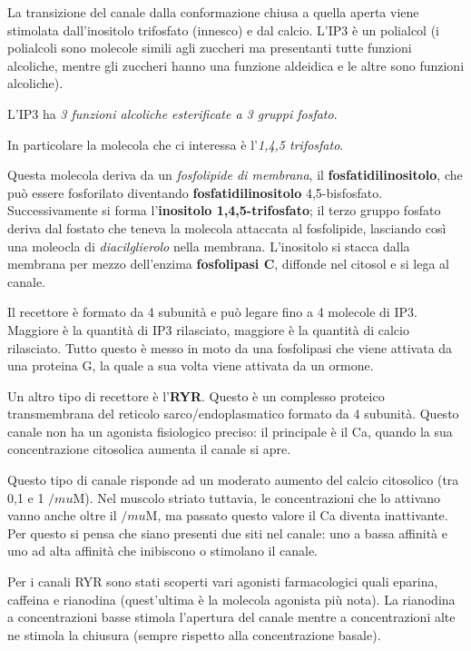 \documentclass[]{article}
\begin{document}
La transizione del canale dalla conformazione chiusa a quella aperta
viene stimolata dall'inositolo trifosfato (innesco) e dal calcio. L'IP3
è un polialcol (i polialcoli sono molecole simili agli zuccheri ma
presentanti tutte funzioni alcoliche, mentre gli zuccheri hanno una
funzione aldeidica e le altre sono funzioni alcoliche).

L'IP3 ha \emph{3 funzioni alcoliche esterificate a 3 gruppi fosfato}.

In particolare la molecola che ci interessa è l'\emph{1,4,5 trifosfato}.

Questa molecola deriva da un \emph{fosfolipide di membrana}, il
\textbf{fosfatidilinositolo}, che può essere fosforilato diventando
\textbf{fosfatidilinositolo} 4,5-bisfosfato. Successivamente si forma
l'\textbf{inositolo 1,4,5-trifosfato}; il terzo gruppo fosfato deriva
dal fostato che teneva la molecola attaccata al fosfolipide, lasciando
così una moleocla di \emph{diacilglierolo} nella membrana. L'inositolo
si stacca dalla membrana per mezzo dell'enzima \textbf{fosfolipasi C},
diffonde nel citosol e si lega al canale.

Il recettore è formato da 4 subunità e può legare fino a 4 molecole di
IP3. Maggiore è la quantità di IP3 rilasciato, maggiore è la quantità di
calcio rilasciato. Tutto questo è messo in moto da una fosfolipasi che
viene attivata da una proteina G, la quale a sua volta viene attivata da
un ormone.

Un altro tipo di recettore è l'\textbf{RYR}. Questo è un complesso
proteico transmembrana del reticolo sarco/endoplasmatico formato da 4
subunità. Questo canale non ha un agonista fisiologico preciso: il
principale è il Ca, quando la sua concentrazione citosolica aumenta il
canale si apre.

Questo tipo di canale risponde ad un moderato aumento del calcio
citosolico (tra 0,1 e 1 \(/mu\)M). Nel muscolo striato tuttavia, le
concentrazioni che lo attivano vanno anche oltre il \(/mu\)M, ma passato
questo valore il Ca diventa inattivante. Per questo si pensa che siano
presenti due siti nel canale: uno a bassa affinità e uno ad alta
affinità che inibiscono o stimolano il canale.

Per i canali RYR sono stati scoperti vari agonisti farmacologici quali
eparina, caffeina e rianodina (quest'ultima è la molecola agonista più
nota). La rianodina a concentrazioni basse stimola l'apertura del canale
mentre a concentrazioni alte ne stimola la chiusura (sempre rispetto
alla concentrazione basale).
\end{document}
